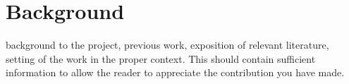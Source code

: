 \chapter{Background}
    background to the project, previous work, exposition of relevant literature, setting of the work in the proper context. This should contain sufficient information to allow the reader to appreciate the contribution you have made.